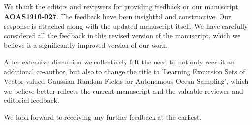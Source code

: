 \documentclass[10pt,stdletter]{newlfm}
\begin{document}
\begin{newlfm}

We thank the editors and reviewers for providing feedback on our manuscript \textbf{AOAS1910-027}. The feedback have been insightful and constructive. Our response is attached along with the updated manuscript itself. We have carefully considered all the feedback in this revised version of the manuscript, which we believe is a significantly improved version of our work. 

After extensive discussion we collectively felt the need to not only recruit an additional co-author, but also to change the title to 'Learning Excursion Sets of Vector-valued Gaussian Random Fields for Autonomous Ocean Sampling', which we believe better reflects the current manuscript and the valuable reviewer and editorial feedback. 

We look forward to receiving any further feedback at the earliest.
\vspace{1em}


\end{newlfm}
\end{document}
